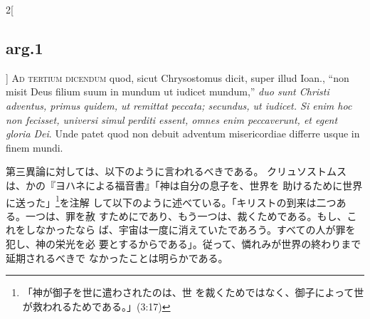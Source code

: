 \documentclass[paper=a4paper,fontsize=10pt,jafontsize=9pt,titlepage]{jlreq}
\begin{document}
\begin{paracol}{2}[\subsection{arg.1}]
{\scshape Ad tertium dicendum} quod, sicut Chrysostomus
dicit, super illud Ioan., ``non misit Deus filium suum in mundum ut
iudicet mundum,'' {\itshape duo sunt Christi adventus, primus quidem, ut remittat
peccata; secundus, ut iudicet. Si enim hoc non fecisset, universi simul
perditi essent, omnes enim peccaverunt, et egent gloria Dei}. Unde patet
quod non debuit adventum misericordiae differre usque in finem mundi.

\switchcolumn

第三異論に対しては、以下のように言われるべきである。
クリュソストムスは、かの『ヨハネによる福音書』「神は自分の息子を、世界を
 助けるために世界に送った」\footnote{「神が御子を世に遣わされたのは、世
 を裁くためではなく、御子によって世が救われるためである。」(3:17)}を注解
 して以下のように述べている。「キリストの到来は二つある。一つは、罪を赦
 すためにであり、もう一つは、裁くためである。もし、これをしなかったなら
 ば、宇宙は一度に消えていたであろう。すべての人が罪を犯し、神の栄光を必
 要とするからである」。従って、憐れみが世界の終わりまで延期されるべきで
 なかったことは明らかである。

\end{paracol}
\end{document}
